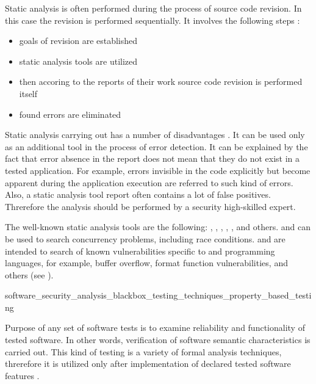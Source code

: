 %
Static analysis is often performed during the process of source code revision. 
%
In this case the revision is performed sequentially. 
It involves the following steps : 
\begin{itemize}
	\item goals of revision are established
	\item static analysis tools are utilized
	\item then accoring to the reports of their work source code revision is performed itself
	\item found errors are eliminated
\end{itemize}

%
Static analysis carrying out has a number of disadvantages  . 
%
It can be used only as an additional tool in the process of error detection. 
%
It can be explained by the fact that error absence in the report does not mean that they do not exist in a tested application. 
%
For example, errors invisible in the code explicitly but become apparent during the application execution are referred to such kind of errors. 
%
Also, a static analysis tool report often contains a lot of false positives. 
%
Threrefore the analysis should be performed by a security high-skilled expert. 

%
The well-known static analysis tools are the following:  ,  ,  ,  ,  , and others.
%
 and  can be used to search concurrency problems, including race conditions. 
%
 and  are intended to search of known vulnerabilities specific to  and  programming languages, for example, buffer overflow, format function vulnerabilities, and others (see ). 


	{software_security_analysis_blackbox_testing_techniques_property_based_testing}

%
Purpose of any set of software tests is to examine reliability and functionality of tested software. 
%
In other words, verification of software semantic characteristics is carried out. 
%
This kind of testing is a variety of formal analysis techniques, threrefore it is utilized only after implementation of declared tested software features . 

